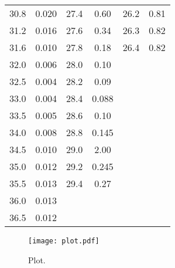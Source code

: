 \begin{longtable}{S[table-format=3.2] S[table-format=3.2] S[table-format=3.2] S[table-format=3.2] S[table-format=3.2] S[table-format=3.2]}
          30.8   &   0.020  &     27.4    &  0.60   & 26.2   &   0.81                                      \\
          31.2   &   0.016  &     27.6    &  0.34   & 26.3   &   0.82                                      \\
          31.6   &   0.010  &     27.8    &  0.18   & 26.4   &   0.82                                      \\
          32.0   &   0.006  &     28.0    &  0.10                                                          \\
          32.5   &   0.004  &     28.2    &  0.09                                                          \\
          33.0   &   0.004  &     28.4    & 0.088                                                          \\
          33.5   &   0.005  &     28.6    &  0.10                                     \\
          34.0   &   0.008  &     28.8    & 0.145                                     \\
          34.5   &   0.010  &     29.0    &  2.00                                     \\
          35.0   &   0.012  &     29.2    & 0.245                                     \\
          35.5   &   0.013  &     29.4    &  0.27                                     \\
          36.0   &   0.013  &                                     \\
          36.5   &   0.012  &                                     \\
                \bottomrule
\end{longtable}


\begin{figure}
  \centering
  \texttt{[image: plot.pdf]}
  \caption{Plot.}
  \label{fig:plot}
\end{figure}
